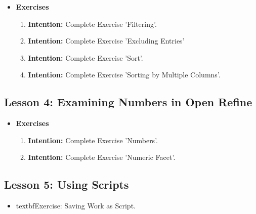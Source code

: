 \documentclass{article}
\begin{document}
\begin{itemize}
\item{\textbf{Exercises}}

\begin{enumerate}

\item{\textbf{Intention:} Complete Exercise 'Filtering'.}

\item{\textbf{Intention:} Complete Exercise 'Excluding Entries'}

\item{\textbf{Intention:} Complete Exercise 'Sort'.}

\item{\textbf{Intention:} Complete Exercise 'Sorting by Multiple Columns'.}



\end{enumerate}
\end{itemize}



\subsection{Lesson 4: Examining Numbers in Open Refine}

\begin{itemize}
\item{\textbf{Exercises}}

\begin{enumerate}

\item{\textbf{Intention:} Complete Exercise 'Numbers'.}

\item{\textbf{Intention:} Complete Exercise 'Numeric Facet'.}



\end{enumerate}
\end{itemize}





\subsection{Lesson 5: Using Scripts}

\begin{itemize}
    \item{textbf{Exercise: Saving Work as Script.}}
    
\end{itemize}
\end{document}
